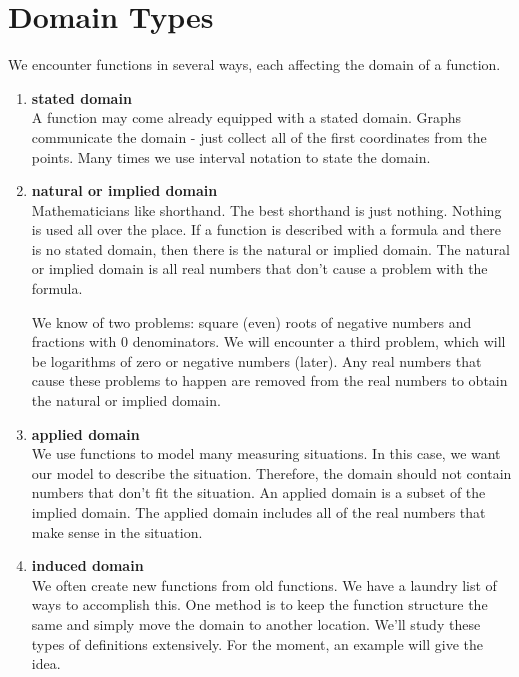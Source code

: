 \documentclass{ximera}
\begin{document}
\section{Domain Types}

We encounter functions in several ways, each affecting the domain of a function.

\begin{enumerate}
\item  \textbf{\textcolor{green!50!black}{stated domain}}   \\
A function may come already equipped with a stated domain.  Graphs communicate the domain - just collect all of the first coordinates from the points. Many times we use interval notation to state the domain.


\item  \textbf{\textcolor{green!50!black}{natural or implied domain}}   \\
Mathematicians like shorthand. The best shorthand is just nothing.  Nothing is used all over the place. If a function is described with a formula and there is no stated domain, then there is the natural or implied domain.  The natural or implied domain is all real numbers that don't cause a problem with the formula.

We know of two problems: square (even) roots of negative numbers and fractions with $0$ denominators.  We will encounter a third problem, which will be logarithms of zero or negative numbers (later). Any real numbers that cause these problems to happen are removed from the real numbers to obtain the natural or implied domain.


\item  \textbf{\textcolor{green!50!black}{applied domain}}   \\
We use functions to model many measuring situations. In this case, we want our model to describe the situation.  Therefore, the domain should not contain numbers that don't fit the situation. An applied domain is a subset of the implied domain.  The applied domain includes all of the real numbers that make sense in the situation.


\item \textbf{\textcolor{green!50!black}{induced domain}}  \\
We often create new functions from old functions. We have a laundry list of ways to accomplish this.  One method is to keep the function structure the same and simply move the domain to another location. We'll study these types of definitions extensively. For the moment, an example will give the idea. \\








\end{enumerate}
\end{document}
